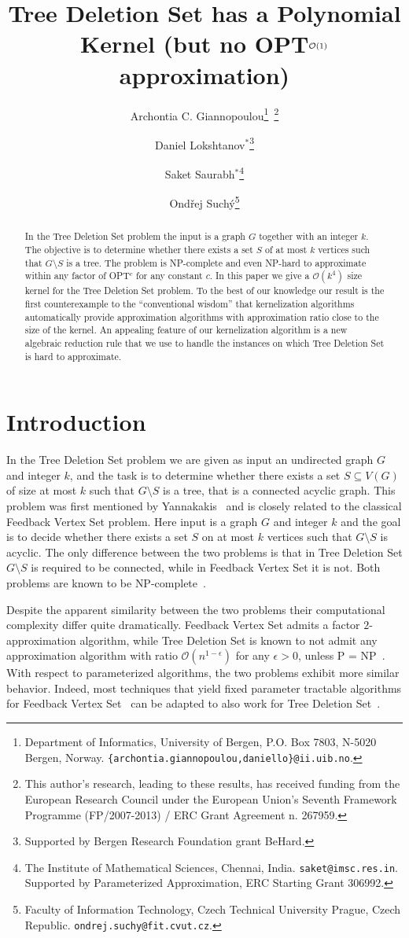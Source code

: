 \documentclass[a4paper,11pt]{article}
\title{\bf Tree Deletion Set has a Polynomial Kernel
\newline
(but no OPT$^{\Oh(1)}$ approximation)
}
\author{Archontia C. Giannopoulou\thanks{Department of Informatics, University of Bergen, P.O. Box 7803, N-5020 Bergen, Norway.
\texttt{\{archontia.giannopoulou,daniello\}@ii.uib.no}.}~\thanks{This author's research, leading to these results, has received funding from the European Research Council under the European Union's Seventh Framework Programme (FP/2007-2013) / ERC Grant Agreement n. 267959.} 
\and Daniel Lokshtanov$^{*}$\thanks{Supported by Bergen Research Foundation grant BeHard.}
\and Saket Saurabh$^{*}$\thanks{The Institute of Mathematical Sciences, Chennai, India. \texttt{saket@imsc.res.in}. Supported by Parameterized Approximation, ERC Starting Grant 306992.}
\and Ond\v{r}ej Such\'{y}\thanks{Faculty of Information Technology, Czech Technical University Prague, Czech Republic. \texttt{ondrej.suchy@fit.cvut.cz}.}
}
\date{}
\newcommand{\Oh}{{\mathcal{O}}}
\begin{document}
\maketitle

\begin{abstract}
In the {\sc Tree Deletion Set} problem the input is a graph $G$ together with an integer $k$. The objective is to determine whether there exists a set $S$ of at most $k$ vertices such that $G \setminus S$ is a tree. The problem is {\sf NP}-complete and even {\sf NP}-hard to approximate within any factor of OPT$^c$ for any constant $c$. In this paper we give a $\Oh(k^4)$ size kernel for the {\sc Tree Deletion Set} problem. To the best of our knowledge our result is the first counterexample to the ``conventional wisdom'' that kernelization algorithms automatically provide approximation algorithms with approximation ratio close to the size of the kernel.
An appealing feature of our kernelization algorithm is a new algebraic reduction rule that we use to handle the instances on which {\sc Tree Deletion Set} is hard to approximate.
\end{abstract}

\section{Introduction} \label{sec_intro}
In the {\sc Tree Deletion Set} problem we are given as input an undirected graph $G$ and integer $k$, and the task is to determine whether there exists a set $S \subseteq V(G)$ of size at most $k$ such that $G \setminus S$ is a tree, that is a connected acyclic graph. This problem was first mentioned by Yannakakis~\cite{Yannakakis79} and is closely related to the classical {\sc Feedback Vertex Set} problem. Here input is a graph $G$ and integer $k$ and the goal is to decide whether there exists a set $S$ on at most $k$ vertices such that $G \setminus S$ is acyclic. The only difference between the two problems is that in {\sc Tree Deletion Set} $G \setminus S$ is required to be connected, while in {\sc Feedback Vertex Set} it is not. Both problems are known to be {\sf NP}-complete~\cite{GJ79,Yannakakis79}.

Despite the apparent similarity between the two problems their computational complexity differ quite dramatically. {\sc Feedback Vertex Set} admits a factor $2$-approximation algorithm, while {\sc Tree Deletion Set} is known to not admit any approximation algorithm with ratio $\Oh(n^{1-\epsilon})$ for any $\epsilon > 0$, unless {\sf P} = {\sf NP}~\cite{BafnaBF99,Yannakakis79}. With respect to parameterized algorithms, the two problems exhibit more similar behavior. Indeed, most techniques that yield fixed parameter tractable algorithms for {\sc Feedback Vertex Set}~\cite{ChenFLLV08,CaoCL10} can be adapted to also work for {\sc Tree Deletion Set}~\cite{RamanSS13}. 
\end{document}
